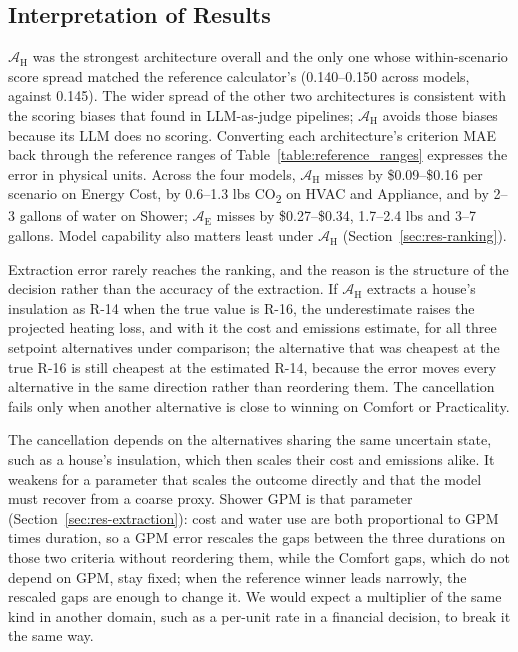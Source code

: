 \documentclass[final,3p,times]{elsarticle}
\begin{document}
\subsection{Interpretation of Results}
\label{sec:interpretation}
$\mathcal{A}_{\text{H}}$ was the strongest architecture overall and the only one whose within-scenario score spread matched the reference calculator's (0.140--0.150 across models, against 0.145). The wider spread of the other two architectures is consistent with the scoring biases that \citet{li2026scoringbias} found in LLM-as-judge pipelines; $\mathcal{A}_{\text{H}}$ avoids those biases because its LLM does no scoring. Converting each architecture's criterion MAE back through the reference ranges of Table~\ref{table:reference_ranges} expresses the error in physical units. Across the four models, $\mathcal{A}_{\text{H}}$ misses by \$0.09--\$0.16 per scenario on Energy Cost, by 0.6--1.3 lbs CO\textsubscript{2} on HVAC and Appliance, and by 2--3 gallons of water on Shower; $\mathcal{A}_{\text{E}}$ misses by \$0.27--\$0.34, 1.7--2.4 lbs and 3--7 gallons. Model capability also matters least under $\mathcal{A}_{\text{H}}$ (Section~\ref{sec:res-ranking}).

Extraction error rarely reaches the ranking, and the reason is the structure of the decision rather than the accuracy of the extraction. If $\mathcal{A}_{\text{H}}$ extracts a house's insulation as R-14 when the true value is R-16, the underestimate raises the projected heating loss, and with it the cost and emissions estimate, for all three setpoint alternatives under comparison; the alternative that was cheapest at the true R-16 is still cheapest at the estimated R-14, because the error moves every alternative in the same direction rather than reordering them. The cancellation fails only when another alternative is close to winning on Comfort or Practicality.

The cancellation depends on the alternatives sharing the same uncertain state, such as a house's insulation, which then scales their cost and emissions alike. It weakens for a parameter that scales the outcome directly and that the model must recover from a coarse proxy. Shower GPM is that parameter (Section~\ref{sec:res-extraction}): cost and water use are both proportional to GPM times duration, so a GPM error rescales the gaps between the three durations on those two criteria without reordering them, while the Comfort gaps, which do not depend on GPM, stay fixed; when the reference winner leads narrowly, the rescaled gaps are enough to change it. We would expect a multiplier of the same kind in another domain, such as a per-unit rate in a financial decision, to break it the same way.
\end{document}
